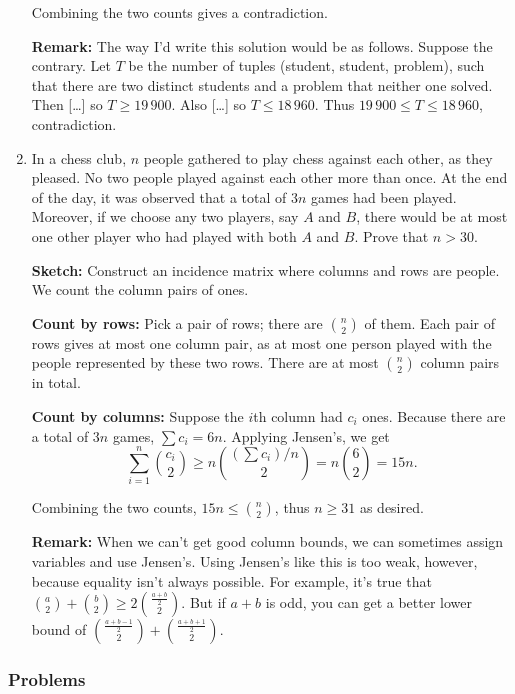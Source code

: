 \documentclass[11pt,paper=letter]{scrartcl}
\newcommand{\cbyrows}{{\bfseries \color{RowBlue} Count by rows: }}
\newcommand{\cbycols}{{\bfseries \color{ColOrange} Count by columns: }}
\begin{document}
\begin{enumerate}
Combining the two counts gives a contradiction.

\textbf{Remark:} The way I'd write this solution would be as follows. Suppose the contrary. Let $T$ be the number of tuples (student, student, problem), such that there are two distinct students and a problem that neither one solved. Then [\dots\!] so $T \ge 19\,900$. Also [\dots\!] so $T \le 18\,960$. Thus $19\,900 \le T \le 18\,960$, contradiction.



\item In a chess club, $n$ people gathered to play chess against each other, as they pleased. No two people played against each other more than once. At the end of the day, it was observed that a total of $3n$ games had been played. Moreover, if we choose any two players, say $A$ and $B$, there would be at most one other player who had played with both $A$ and $B$. Prove that $n > 30$.

\textbf{Sketch:} Construct an incidence matrix where columns and rows are people. We count the column pairs of ones.

\cbyrows Pick a pair of rows; there are $\binom n2$ of them. Each pair of rows gives at most one column pair, as at most one person played with the people represented by these two rows. There are at most $\binom n2$ column pairs in total.

\cbycols Suppose the $i$th column had $c_i$ ones. Because there are a total of $3n$ games, $\sum c_i = 6n$. Applying Jensen's, we get \[
  \sum_{i = 1}^{n} \binom{c_i}{2} \ge n \binom{ \left( \sum c_i \right)/n }{2} = n \binom{6}{2} = 15n.
\]

Combining the two counts, $15n \le \binom n2$, thus $n \ge 31$ as desired.

\textbf{Remark:} When we can't get good column bounds, we can sometimes assign variables and use Jensen's. Using Jensen's like this is too weak, however, because equality isn't always possible. For example, it's true that $\binom a2 + \binom b2 \ge 2\binom{ \frac{a+ b}{2} }2$. But if $a + b$ is odd, you can get a better lower bound of $\binom{ \frac{a + b - 1}{2} }2 + \binom{ \frac{a + b + 1}{2} }2$.

\end{enumerate}

\subsubsection*{Problems}
\end{document}
